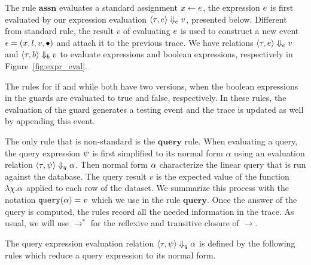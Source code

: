 The rule $\textbf{assn}$ evaluates a standard assignment $\mathrel{ x \leftarrow e }$, the expression $e$ is first evaluated by our expression evaluation $\langle \mathtt{\tau}, e \rangle \Downarrow_e v $, presented below.
{Different from standard rule, the result $v$ of evaluating $e$ is used to construct a new event $\mathtt{\epsilon} = (x, l, v,\bullet)$
and attach it to the previous trace. }
We have relations $\langle \mathtt{\tau}, e \rangle \Downarrow_e v $  and $\langle \mathtt{\tau}, b \rangle \Downarrow_b v $  to evaluate expressions and boolean expressions, respectively in Figure~\ref{fig:expr_eval}.

The rules for if and while both have two versions, 
when the boolean expressions in the guards are evaluated to true and false, respectively. 
In these rules, the evaluation of the guard generates a testing event and the trace is updated as well by appending this event.

The only rule that is non-standard is the $\textbf{query}$ rule. When evaluating a query, the query expression $\psi$ is first simplified to its normal form $\alpha$ using an evaluation relation 
$\langle \mathtt{\tau}, \psi \rangle \Downarrow_q \alpha$. 
Then normal form $\alpha$ characterize the linear query that is run against the database. 
The query result $v$ is the expected value of the function $\lambda \chi.\alpha$ applied to each row of the dataset. 
We summarize this process with the notation ${\tt query}(\alpha) = v$ which we use in the rule $\textbf{query}$. 
Once the answer of the query is computed, the rules record all the needed information in the trace. 
As usual, we will use $\to^*$ for the reflexive and transitive closure of $\to$. 
 
The query expression evaluation relation  $\langle \mathtt{\tau}, \psi \rangle \Downarrow_q \alpha$ is defined by the following rules which reduce a query expression to its normal form.
{\small
{}
 }

